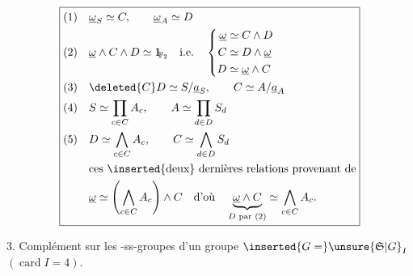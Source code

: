 
\[
\boxed{\begin{aligned}
(1)\quad &\underline\omega_S\simeq C,\qquad \underline\omega_A\simeq D\\
(2)\quad &\underline\omega\wedge C\wedge D\simeq\mathord{1\mkern-4mu\rule{.055em}{.66em}}_{\mathbb F_2}\quad\text{i.e.}\quad
\left\{\begin{aligned}
\underline\omega&\simeq C\wedge D\\ C&\simeq D\wedge\underline\omega\\ D&\simeq\underline\omega\wedge C
\end{aligned}\right.\\
(3)\quad &\deleted{C}D\simeq S/\underline a_S,\qquad C\simeq A/\underline a_A\\
(4)\quad &S\simeq\prod_{c\in C}A_c,\qquad A\simeq\prod_{d\in D} S_d\\
(5)\quad &D\simeq\bigwedge_{c\in C}A_c,\qquad C\simeq\bigwedge_{d\in D}S_d\\
&\text{ces \inserted{deux} dernières relations provenant de}\\
&\underline\omega\simeq\left(\bigwedge_{c\in C}A_c\right)\wedge C\quad
\text{d'où}\quad\underbrace{\underline\omega\wedge C}_{D\text{ par }(2)}
\simeq\bigwedge_{c\in C}A_c.
\end{aligned}}
\]

3. Complément sur les -ss-groupes  d'un groupe $\inserted{G=}\unsure{\mathfrak S|G}_I$ $(\operatorname{card} I=4)$.


